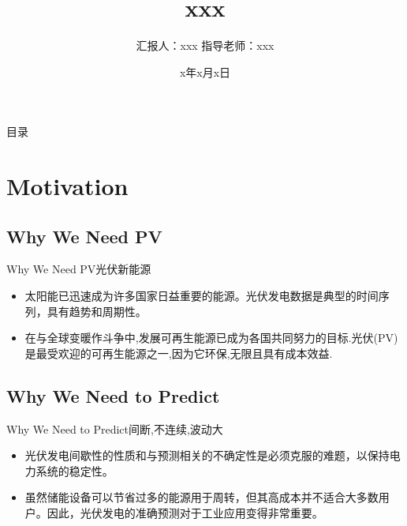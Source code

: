 \documentclass{ctexbeamer}
\title[xxx]{xxx}
\author{汇报人：xxx \newline  指导老师：xxx}
\institute{xxx}
\date{x年x月x日}
\begin{document}
\begin{frame}
  \titlepage
\end{frame}


\begin{frame}{目录}

    \tableofcontents     %
  
\end{frame}

\AtBeginSection[]{
	\begin{frame}
		\tableofcontents[currentsection]
	\end{frame}
} %



\graphicspath{{figures/}}

\section{Motivation}
\subsection{Why We Need PV}

    \begin{frame}{Why We Need PV}{光伏新能源}
        \begin{itemize}
        \item
        太阳能已迅速成为许多国家日益重要的能源。光伏发电数据是典型的时间序列，具有趋势和周期性。
        \item
        在与全球变暖作斗争中,发展可再生能源已成为各国共同努力的目标.光伏(PV)是最受欢迎的可再生能源之一,因为它环保,无限且具有成本效益.
        \end{itemize}
    \end{frame}



\subsection{Why We Need to Predict}
    \begin{frame}{Why We Need to Predict}{间断,不连续,波动大}
        \begin{itemize}
        \item
        光伏发电间歇性的性质和与预测相关的不确定性是必须克服的难题，以保持电力系统的稳定性。
        \item
        虽然储能设备可以节省过多的能源用于周转，但其高成本并不适合大多数用户。因此，光伏发电的准确预测对于工业应用变得非常重要。
        \end{itemize}
    \end{frame}
\end{document}
